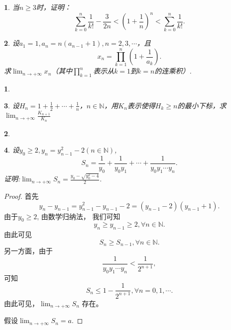 \documentclass[utf8]{book}
\newtheorem{example}{}[section]             %
\newtheorem{solution}{}
\begin{document}
\begin{example}
当$n\geq 3$时，证明：
$$\displaystyle\sum_{k=0}^n\frac{1}{k!}-\frac{3}{2n}<\left(1+\frac{1}{n}\right)^n < \displaystyle\sum_{k=0}^n\frac{1}{k!}.$$
\end{example}
\begin{example}
设$a_1=1, a_n=n(a_{n-1}+1), n=2,3,\cdots$，且
\[
x_n = \prod_{k=1}^n\left(1+\frac{1}{a_k}\right).
\]求$\displaystyle\lim_{n\to +\infty}x_n$（其中$\displaystyle\prod_{k=1}^n$表示从$k=1$到$k=n$的连乘积）.
\end{example}
\begin{solution}

\end{solution}
\begin{example}
设$H_n=1+\frac{1}{2}+\cdots+\frac{1}{n}$，$n\in\mathbb{N}$，用$K_n$表示使得$H_k\geq n$的最小下标，求$\displaystyle\lim_{n\to +\infty}\frac{K_{n+1}}{K_n}$
\end{example}
\begin{solution}
\end{solution}
\begin{example}
设$y_0\geq 2, y_n = y_{n-1}^2 - 2(n\in\mathbb{N})$,
\[
S_n=\frac{1}{y_0}+\frac{1}{y_0y_1} +\cdots + \frac{1}{y_0y_1\cdots y_n}.
\]证明:$\displaystyle\lim_{n\to +\infty}S_n=\frac{y_0-\sqrt{y_0^2-4}}{2}$.
\end{example}
\begin{proof}
首先$$y_n - y_{n-1} = y_{n-1}^2 - y_{n-1} - 2 = (y_{n-1}-2)(y_{n-1} + 1).$$
由于$y_0\geq 2$, 由数学归纳法， 我们可知
$$y_n \geq y_{n-1} \geq 2, \forall n \in\mathbb{N}.$$
由此可见
$$S_n \geq S_{n-1}, \forall n\in\mathbb{N}.$$
另一方面，由于$$\frac{1}{y_0y_1\cdots y_n} < \frac{1}{2^{n+1}},$$
可知$$S_n \leq 1 -\frac{1}{2^{n+1}}, \forall n = 0, 1, \cdots.$$
由此可见，$\displaystyle\lim_{n\to +\infty}S_n$ 存在。

假设$\displaystyle\lim_{n\to +\infty}S_n = a$.
\end{proof}




\end{document}
